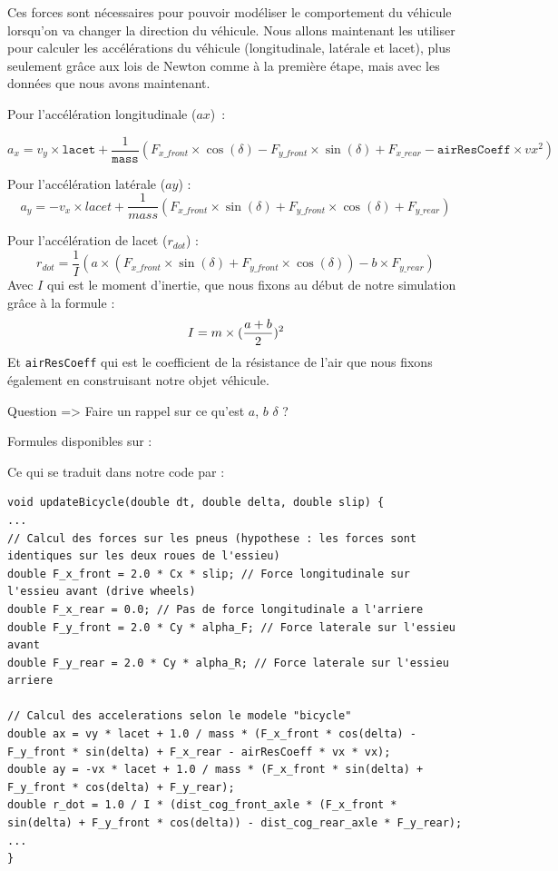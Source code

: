 Ces forces sont nécessaires pour pouvoir modéliser le comportement du véhicule lorsqu'on va changer la direction du véhicule. Nous allons maintenant les utiliser pour calculer les accélérations du véhicule (longitudinale, latérale et lacet), plus seulement grâce aux lois de Newton comme à la première étape, mais avec les données que nous avons maintenant.

Pour l'accélération longitudinale ($ax$) :


$$a_x = v_y \times \texttt{lacet} + \frac{1}{\texttt{mass}}(F_{x\_front} \times \cos(\delta) - F_{y\_front} \times \sin(\delta) + F_{x\_rear} - \texttt{airResCoeff} \times vx^2)$$

Pour l'accélération latérale ($ay$) :
$$a_y=-v_x\times lacet + \frac{1}{mass}(F_{x\_front} \times \sin(\delta) + F_{y\_front} \times \cos(\delta) + F_{y\_rear})$$

Pour l'accélération de lacet ($r_{dot}$) :
$$r_{dot} = \frac{1}{I}(a \times (F_{x\_front} \times \sin(\delta) + F_{y\_front} \times \cos(\delta)) - b \times F_{y\_rear})$$
Avec $I$ qui est le moment d'inertie, que nous fixons au début de notre simulation grâce à la formule : $$I = m \times ({{a+b}\over{2}})^2$$
Et \texttt{airResCoeff} qui est le coefficient de la résistance de l'air que nous fixons également en construisant notre objet véhicule. \newline

{\Large Question => Faire un rappel sur ce qu'est $a$, $b$ $\delta$ ?}
\begin{center}
Formules disponibles sur : \cite{VDS_MathWorks}
\end{center}


Ce qui se traduit dans notre code par :

\begin{lstlisting}[style=CStyle]
void updateBicycle(double dt, double delta, double slip) {
...
// Calcul des forces sur les pneus (hypothese : les forces sont identiques sur les deux roues de l'essieu)
double F_x_front = 2.0 * Cx * slip; // Force longitudinale sur l'essieu avant (drive wheels)
double F_x_rear = 0.0; // Pas de force longitudinale a l'arriere
double F_y_front = 2.0 * Cy * alpha_F; // Force laterale sur l'essieu avant
double F_y_rear = 2.0 * Cy * alpha_R; // Force laterale sur l'essieu arriere

// Calcul des accelerations selon le modele "bicycle"
double ax = vy * lacet + 1.0 / mass * (F_x_front * cos(delta) - F_y_front * sin(delta) + F_x_rear - airResCoeff * vx * vx);
double ay = -vx * lacet + 1.0 / mass * (F_x_front * sin(delta) + F_y_front * cos(delta) + F_y_rear);
double r_dot = 1.0 / I * (dist_cog_front_axle * (F_x_front * sin(delta) + F_y_front * cos(delta)) - dist_cog_rear_axle * F_y_rear);
...
}
\end{lstlisting}

